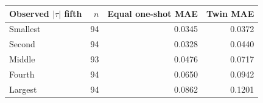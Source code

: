 \begin{tabular}{lrrr}
\toprule
Observed $|\tau|$ fifth & $n$ & Equal one-shot MAE & Twin MAE \\
\midrule
Smallest & 94 & 0.0345 & 0.0372 \\
Second & 94 & 0.0328 & 0.0440 \\
Middle & 93 & 0.0476 & 0.0717 \\
Fourth & 94 & 0.0650 & 0.0942 \\
Largest & 94 & 0.0862 & 0.1201 \\
\bottomrule
\end{tabular}
